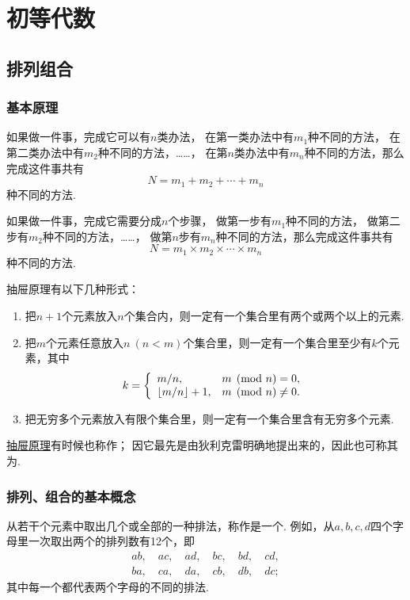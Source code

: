 \chapter{初等代数}
\section{排列组合}
\subsection{基本原理}
\begin{axiom}[加法原理]
如果做一件事，完成它可以有\(n\)类办法，
在第一类办法中有\(m_1\)种不同的方法，
在第二类办法中有\(m_2\)种不同的方法，……，
在第\(n\)类办法中有\(m_n\)种不同的方法，那么完成这件事共有\[
N = m_1 + m_2 + \dotsb + m_n
\]种不同的方法.
\end{axiom}

\begin{axiom}[乘法原理]
如果做一件事，完成它需要分成\(n\)个步骤，
做第一步有\(m_1\)种不同的方法，
做第二步有\(m_2\)种不同的方法，……，
做第\(n\)步有\(m_n\)种不同的方法，那么完成这件事共有\[
N = m_1 \times m_2 \times \dotsm \times m_n
\]种不同的方法.
\end{axiom}

\begin{theorem}[抽屉原理]\label{theorem:排列组合.抽屉原理}
抽屉原理有以下几种形式：
\begin{enumerate}
\item 把\(n+1\)个元素放入\(n\)个集合内，则一定有一个集合里有两个或两个以上的元素.
\item 把\(m\)个元素任意放入\(n\ (n<m)\)个集合里，则一定有一个集合里至少有\(k\)个元素，其中\[
k = \left\{ \begin{array}{ll}
m/n, & m \pmod n = 0, \\
\lfloor m/n\rfloor+1, & m \pmod n \neq 0.
\end{array} \right.
\]
\item 把无穷多个元素放入有限个集合里，则一定有一个集合里含有无穷多个元素.
\end{enumerate}
\end{theorem}
\hyperref[theorem:排列组合.抽屉原理]{抽屉原理}有时候也称作；
因它最先是由狄利克雷明确地提出来的，因此也可称其为.

\subsection{排列、组合的基本概念}
从若干个元素中取出几个或全部的一种排法，称作是一个.
例如，从\(a,b,c,d\)四个字母里一次取出两个的排列数有12个，即\[
	\begin{gathered}
	ab, \quad
	ac, \quad
	ad, \quad
	bc, \quad
	bd, \quad
	cd, \\
	ba, \quad
	ca, \quad
	da, \quad
	cb, \quad
	db, \quad
	dc;
	\end{gathered}
\]
其中每一个都代表两个字母的不同的排法.

